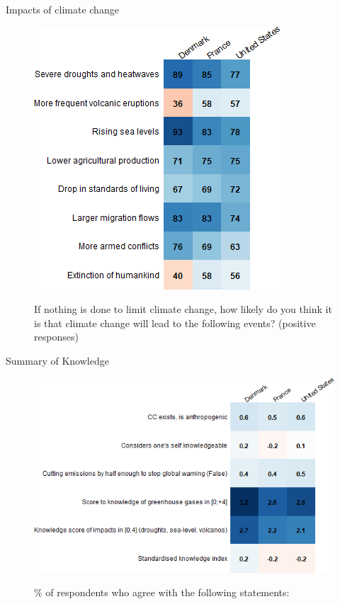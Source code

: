 \documentclass[aspectratio=169,9pt,dvipsnames]{beamer}
\begin{document}
\begin{frame}{Impacts of climate change}%
\begin{figure}[h!]
\centering
\caption{If nothing is done to limit climate change, how likely do you think it is that climate change will lead to the following events? (positive responses)}
\includegraphics[width=.45\textwidth]{../figures/country_comparison/CC_impacts_positive_countries.png} \\
\end{figure}
\end{frame}


\begin{frame}{Summary of Knowledge}%
\begin{figure}[h!]
\centering
\caption{\% of respondents who agree with the following statements:}
\includegraphics[width=.7\textwidth]{../figures/country_comparison/knowledge_wo_footprint_mean_countries.png} \\
\end{figure}
\end{frame}
\end{document}

